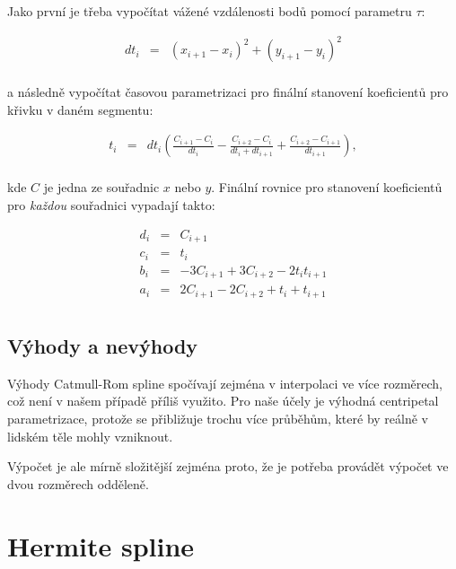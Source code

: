 \documentclass[]{thesiskiv}
\begin{document}
Jako první je třeba vypočítat vážené vzdálenosti bodů pomocí parametru $\tau$:

\begin{equation}
\begin{array}{rcl}
 dt_{i}   & = & (x_{i+1} - x_i)^2 + (y_{i+1} - y_i)^2 \\
\end{array}
\end{equation}

a následně vypočítat časovou parametrizaci pro finální stanovení koeficientů pro křivku v daném segmentu:

\begin{equation}
\begin{array}{rcl}
 t_i & = & dt_{i} ( \frac{C_{i+1} - C_i}{dt_{i}} - \frac{C_{i+2} - C_i}{dt_{i} + dt_{i+1}} + \frac{C_{i+2} - C_{i+1}}{dt_{i+1}} ), \\
\end{array}
\end{equation}

kde $C$ je jedna ze souřadnic $x$ nebo $y$. Finální rovnice pro stanovení koeficientů pro \emph{každou} souřadnici vypadají takto:

\begin{equation}
\begin{array}{rcl}
 d_i & = & C_{i+1} \\
 c_i & = & t_{i} \\
 b_i & = & -3 C_{i+1} + 3 C_{i+2} - 2 t_i t_{i+1} \\
 a_i & = & 2 C_{i+1} - 2 C_{i+2} + t_i + t_{i+1} \\
\end{array}
\end{equation}

\subsection*{Výhody a nevýhody}

Výhody Catmull-Rom spline spočívají zejména v interpolaci ve více rozměrech, což není v našem případě příliš využito. Pro naše účely je výhodná centripetal parametrizace, protože se přibližuje trochu více průběhům, které by reálně v lidském těle mohly vzniknout.

Výpočet je ale mírně složitější zejména proto, že je potřeba provádět výpočet ve dvou rozměrech odděleně.

\section{Hermite spline}
\end{document}
